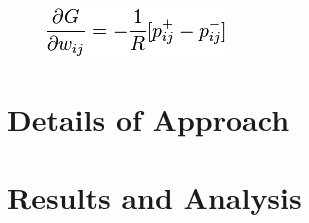 \documentclass[12pt]{article}
\begin{document}

  \begin{figure}
    \includegraphics{rbm_eq}
  \end{figure}


\section{Details of Approach}



\section{Results and Analysis}
  
\end{document}

